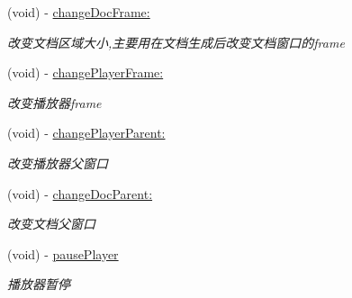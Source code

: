 \begin{DoxyCompactItemize}
\mbox{\label{interface_request_data_play_back_a3651d4b5f32d770f5542a8f4ee5978ef}} 
(void) -\/ \hyperlink{interface_request_data_play_back_a3651d4b5f32d770f5542a8f4ee5978ef}{change\+Doc\+Frame\+:}
\begin{DoxyCompactList}\small\item\em 改变文档区域大小,主要用在文档生成后改变文档窗口的frame \end{DoxyCompactList}\item 
\mbox{\label{interface_request_data_play_back_ac14807bf0739ea6f2f133a643c874bb8}} 
(void) -\/ \hyperlink{interface_request_data_play_back_ac14807bf0739ea6f2f133a643c874bb8}{change\+Player\+Frame\+:}
\begin{DoxyCompactList}\small\item\em 改变播放器frame \end{DoxyCompactList}\item 
\mbox{\label{interface_request_data_play_back_ae205a635e0cad31dde2beec67fae08aa}} 
(void) -\/ \hyperlink{interface_request_data_play_back_ae205a635e0cad31dde2beec67fae08aa}{change\+Player\+Parent\+:}
\begin{DoxyCompactList}\small\item\em 改变播放器父窗口 \end{DoxyCompactList}\item 
\mbox{\label{interface_request_data_play_back_a9510f1fefa5e2323763ababc81e30f30}} 
(void) -\/ \hyperlink{interface_request_data_play_back_a9510f1fefa5e2323763ababc81e30f30}{change\+Doc\+Parent\+:}
\begin{DoxyCompactList}\small\item\em 改变文档父窗口 \end{DoxyCompactList}\item 
\mbox{\label{interface_request_data_play_back_a79d84970313b229f7081bb5fac4dd623}} 
(void) -\/ \hyperlink{interface_request_data_play_back_a79d84970313b229f7081bb5fac4dd623}{pause\+Player}
\begin{DoxyCompactList}\small\item\em 播放器暂停 \end{DoxyCompactList}\item 

\end{DoxyCompactItemize}
